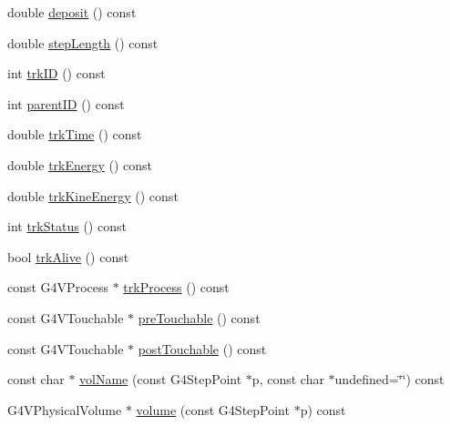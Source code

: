 \begin{DoxyCompactItemize}
double \hyperlink{class_d_d4hep_1_1_simulation_1_1_geant4_step_handler_af06796925f270fe69057201b9b815657}{deposit} () const
\item 
double \hyperlink{class_d_d4hep_1_1_simulation_1_1_geant4_step_handler_a4d10cc802cc8a07492695d7aff68a87f}{step\+Length} () const
\item 
int \hyperlink{class_d_d4hep_1_1_simulation_1_1_geant4_step_handler_aeebb8ecf7ce627d87e08d61b712e32b5}{trk\+ID} () const
\item 
int \hyperlink{class_d_d4hep_1_1_simulation_1_1_geant4_step_handler_a2bec797f0c464cf576382c62b900ff40}{parent\+ID} () const
\item 
double \hyperlink{class_d_d4hep_1_1_simulation_1_1_geant4_step_handler_aab3ccbc05dede7d3b67c0623cfbaadfb}{trk\+Time} () const
\item 
double \hyperlink{class_d_d4hep_1_1_simulation_1_1_geant4_step_handler_a41eb8945c98180d3da922d1781504bad}{trk\+Energy} () const
\item 
double \hyperlink{class_d_d4hep_1_1_simulation_1_1_geant4_step_handler_a9b1be56b8cea41c5e210cf2b53bf7763}{trk\+Kine\+Energy} () const
\item 
int \hyperlink{class_d_d4hep_1_1_simulation_1_1_geant4_step_handler_ab1a42f1b82a5b21c01681c6c4c3a61fa}{trk\+Status} () const
\item 
bool \hyperlink{class_d_d4hep_1_1_simulation_1_1_geant4_step_handler_a37df3c141c8f16fbad4f17bf32a4538b}{trk\+Alive} () const
\item 
const G4\+V\+Process $\ast$ \hyperlink{class_d_d4hep_1_1_simulation_1_1_geant4_step_handler_acffd1bd0147db2b8b82802a21ce11e35}{trk\+Process} () const
\item 
const G4\+V\+Touchable $\ast$ \hyperlink{class_d_d4hep_1_1_simulation_1_1_geant4_step_handler_ad2ab7468011fc1d570e24345d458b7fc}{pre\+Touchable} () const
\item 
const G4\+V\+Touchable $\ast$ \hyperlink{class_d_d4hep_1_1_simulation_1_1_geant4_step_handler_a40e0ed6100cd44d95d7ac4f07f938a6d}{post\+Touchable} () const
\item 
const char $\ast$ \hyperlink{class_d_d4hep_1_1_simulation_1_1_geant4_step_handler_ad9fc43129fcb070b2198d3dc37ad1242}{vol\+Name} (const G4\+Step\+Point $\ast$p, const char $\ast$undefined=\char`\"{}\char`\"{}) const
\item 
G4\+V\+Physical\+Volume $\ast$ \hyperlink{class_d_d4hep_1_1_simulation_1_1_geant4_step_handler_ae2a51d281ec1ae871d450ed8076dec71}{volume} (const G4\+Step\+Point $\ast$p) const
\item 

\end{DoxyCompactItemize}
